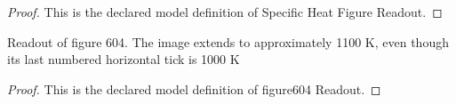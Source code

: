\begin{proof}
  This is the declared model definition of Specific Heat Figure Readout.
\end{proof}
\begin{definition}
  \label{def:physics:phyx-mini-0604:phyxmini0604-figure604readout}
  Readout of figure 604. The image extends to approximately 1100 K, even though its last numbered horizontal tick is 1000 K
\end{definition}
\begin{proof}
  This is the declared model definition of figure604 Readout.
\end{proof}
